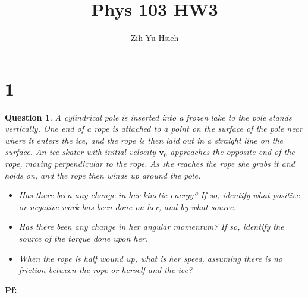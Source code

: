\documentclass{article}
\title{Phys 103 HW3}
\author{Zih-Yu Hsieh}
\newtheorem{question}{Question}
\newcommand{\bv}{\textbf{v}} %
\begin{document}
\maketitle

\section*{1}
\begin{question}\label{q1}
    A cylindrical pole is inserted into a frozen lake to the pole stands vertically. One end of a rope is attached to a point on the surface of the pole near where it enters the ice, and the rope is then laid out in a straight line on the surface. An ice skater with initial velocity $\bv_0$ approaches the opposite end of the rope, moving perpendicular to the rope. As she reaches the rope she grabs it and holds on, and the rope then winds up around the pole.
    \begin{itemize}
        \item[(a)] Has there been any change in her kinetic energy? If so, identify what positive or negative work has been done on her, and by what source.
        \item[(b)] Has there been any change in her angular momentum? If so, identify the source of the torque done upon her.
        \item[(c)] When the rope is half wound up, what is her speed, assuming there is no friction between the rope or herself and the ice?
    \end{itemize}
\end{question}

\textbf{Pf:}

\break
\end{document}
